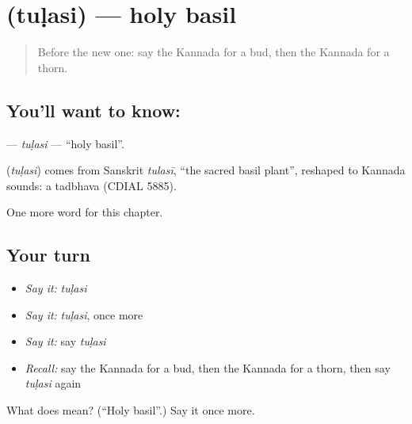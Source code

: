 \section[\texorpdfstring{\kn{ತುಳಸಿ} (tuḷasi)}{ತುಳಸಿ (tuḷasi)}]{ (tuḷasi) — holy basil}

\label{lesson:KA-C188-tulasi}



\begin{quote}
Before the new one: say the Kannada for a bud, then the Kannada for a thorn.
\end{quote}

\subsection*{You'll want to know: }
\textbf{} — \emph{tuḷasi} — \textquotedblleft{}holy basil\textquotedblright{}.

\begin{cousinweb}
\textbf{} (\emph{tuḷasi}) comes from Sanskrit \emph{tulasī}, \textquotedblleft{}the sacred basil plant\textquotedblright{}, reshaped to Kannada sounds: a tadbhava (CDIAL 5885).
\end{cousinweb}

\begin{grammarlens}[title={What you've built}]
One more word for this chapter.
\end{grammarlens}

\subsection*{Your turn}
\begin{itemize}
\raggedright
  \item \emph{Say it:} \emph{tuḷasi}
  \item \emph{Say it:} \emph{tuḷasi}, once more
  \item \emph{Say it:} say \emph{tuḷasi}
  \item \emph{Recall:} say the Kannada for a bud, then the Kannada for a thorn, then say \emph{tuḷasi} again
\end{itemize}

\begin{tcolorbox}[breakable,colback=teal!4,colframe=teal!35!black,title={Before you move on}]
What does  mean? (\textquotedblleft{}Holy basil\textquotedblright{}.) Say it once more.
\end{tcolorbox}
